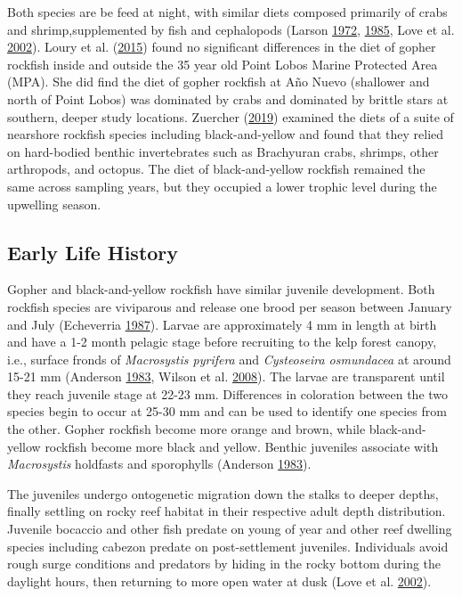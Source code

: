 \documentclass[12pt,]{article}
\begin{document}
Both species are be feed at night, with similar diets composed primarily
of crabs and shrimp,supplemented by fish and cephalopods (Larson
\protect\hyperlink{ref-Larson1972}{1972},
\protect\hyperlink{ref-Hallacher1985}{1985}, Love et al.
\protect\hyperlink{ref-Love2002}{2002}). Loury et al.
(\protect\hyperlink{ref-Loury2015}{2015}) found no significant
differences in the diet of gopher rockfish inside and outside the 35
year old Point Lobos Marine Protected Area (MPA). She did find the diet
of gopher rockfish at Año Nuevo (shallower and north of Point Lobos) was
dominated by crabs and dominated by brittle stars at southern, deeper
study locations. Zuercher (\protect\hyperlink{ref-Zuercher2019}{2019})
examined the diets of a suite of nearshore rockfish species including
black-and-yellow and found that they relied on hard-bodied benthic
invertebrates such as Brachyuran crabs, shrimps, other arthropods, and
octopus. The diet of black-and-yellow rockfish remained the same across
sampling years, but they occupied a lower trophic level during the
upwelling season.

\subsection{Early Life History}\label{early-life-history}

Gopher and black-and-yellow rockfish have similar juvenile development.
Both rockfish species are viviparous and release one brood per season
between January and July (Echeverria
\protect\hyperlink{ref-Echeverria1987}{1987}). Larvae are approximately
4 mm in length at birth and have a 1-2 month pelagic stage before
recruiting to the kelp forest canopy, i.e., surface fronds of
\emph{Macrosystis pyrifera} and \emph{Cysteoseira osmundacea} at around
15-21 mm (Anderson \protect\hyperlink{ref-Anderson1983}{1983}, Wilson et
al. \protect\hyperlink{ref-Wilson2008}{2008}). The larvae are
transparent until they reach juvenile stage at 22-23 mm. Differences in
coloration between the two species begin to occur at 25-30 mm and can be
used to identify one species from the other. Gopher rockfish become more
orange and brown, while black-and-yellow rockfish become more black and
yellow. Benthic juveniles associate with \emph{Macrosystis} holdfasts
and sporophylls (Anderson \protect\hyperlink{ref-Anderson1983}{1983}).

The juveniles undergo ontogenetic migration down the stalks to deeper
depths, finally settling on rocky reef habitat in their respective adult
depth distribution. Juvenile bocaccio and other fish predate on young of
year and other reef dwelling species including cabezon predate on
post-settlement juveniles. Individuals avoid rough surge conditions and
predators by hiding in the rocky bottom during the daylight hours, then
returning to more open water at dusk (Love et al.
\protect\hyperlink{ref-Love2002}{2002}).
\end{document}
